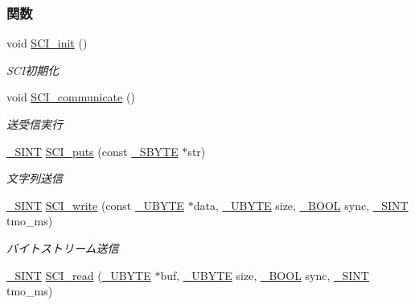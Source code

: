 \subsubsection*{関数}
\begin{DoxyCompactItemize}
\item 
void \hyperlink{sci_8h_a9f5d4690ca7dcd66e71193d76c18391b_a9f5d4690ca7dcd66e71193d76c18391b}{S\+C\+I\+\_\+init} ()
\begin{DoxyCompactList}\small\item\em S\+C\+I初期化 \end{DoxyCompactList}\item 
void \hyperlink{sci_8h_aed4704fa2e59ccf969ed22ba91e76b95_aed4704fa2e59ccf969ed22ba91e76b95}{S\+C\+I\+\_\+communicate} ()
\begin{DoxyCompactList}\small\item\em 送受信実行 \end{DoxyCompactList}\item 
\hyperlink{stddef_8h_aefd1068e35d26c0e7d7079ddf2579174_aefd1068e35d26c0e7d7079ddf2579174}{\+\_\+\+S\+I\+N\+T} \hyperlink{sci_8h_af190c2cffd8521e60eeef84c3a81208e_af190c2cffd8521e60eeef84c3a81208e}{S\+C\+I\+\_\+puts} (const \hyperlink{stddef_8h_aab65237ca9fbf4192a39cf12dd165942_aab65237ca9fbf4192a39cf12dd165942}{\+\_\+\+S\+B\+Y\+T\+E} $\ast$str)
\begin{DoxyCompactList}\small\item\em 文字列送信 \end{DoxyCompactList}\item 
\hyperlink{stddef_8h_aefd1068e35d26c0e7d7079ddf2579174_aefd1068e35d26c0e7d7079ddf2579174}{\+\_\+\+S\+I\+N\+T} \hyperlink{sci_8h_afa2f96406c0057e6939906291282afa3_afa2f96406c0057e6939906291282afa3}{S\+C\+I\+\_\+write} (const \hyperlink{stddef_8h_aac464b47452ce9406f88ef194e2becc1_aac464b47452ce9406f88ef194e2becc1}{\+\_\+\+U\+B\+Y\+T\+E} $\ast$data, \hyperlink{stddef_8h_aac464b47452ce9406f88ef194e2becc1_aac464b47452ce9406f88ef194e2becc1}{\+\_\+\+U\+B\+Y\+T\+E} size, \hyperlink{stddef_8h_afbf708854fe02af8475a9ba02f3196cb_afbf708854fe02af8475a9ba02f3196cb}{\+\_\+\+B\+O\+O\+L} sync, \hyperlink{stddef_8h_aefd1068e35d26c0e7d7079ddf2579174_aefd1068e35d26c0e7d7079ddf2579174}{\+\_\+\+S\+I\+N\+T} tmo\+\_\+ms)
\begin{DoxyCompactList}\small\item\em バイトストリーム送信 \end{DoxyCompactList}\item 
\hyperlink{stddef_8h_aefd1068e35d26c0e7d7079ddf2579174_aefd1068e35d26c0e7d7079ddf2579174}{\+\_\+\+S\+I\+N\+T} \hyperlink{sci_8h_a66e375aea15eee910b1fbf6002f09154_a66e375aea15eee910b1fbf6002f09154}{S\+C\+I\+\_\+read} (\hyperlink{stddef_8h_aac464b47452ce9406f88ef194e2becc1_aac464b47452ce9406f88ef194e2becc1}{\+\_\+\+U\+B\+Y\+T\+E} $\ast$buf, \hyperlink{stddef_8h_aac464b47452ce9406f88ef194e2becc1_aac464b47452ce9406f88ef194e2becc1}{\+\_\+\+U\+B\+Y\+T\+E} size, \hyperlink{stddef_8h_afbf708854fe02af8475a9ba02f3196cb_afbf708854fe02af8475a9ba02f3196cb}{\+\_\+\+B\+O\+O\+L} sync, \hyperlink{stddef_8h_aefd1068e35d26c0e7d7079ddf2579174_aefd1068e35d26c0e7d7079ddf2579174}{\+\_\+\+S\+I\+N\+T} tmo\+\_\+ms)

\end{DoxyCompactItemize}
